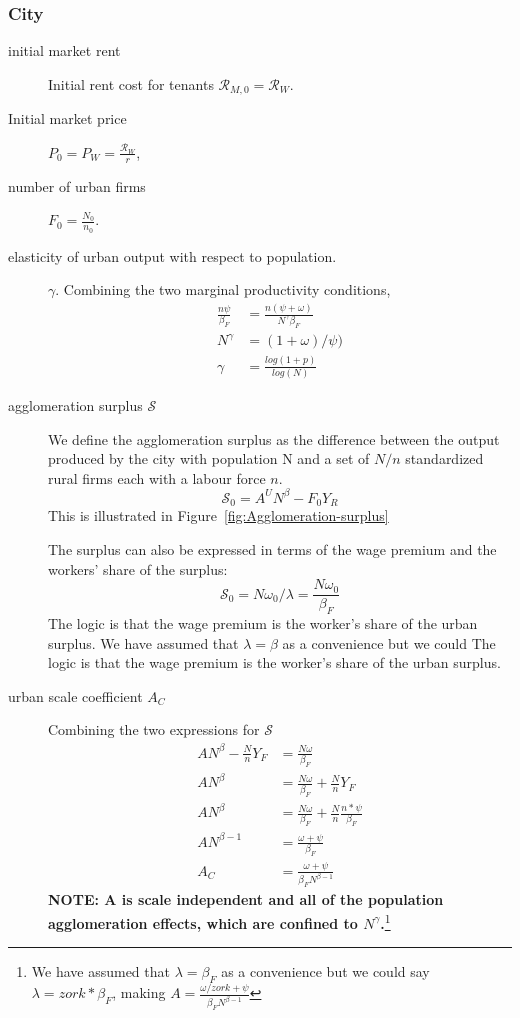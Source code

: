 \subsubsection{City}
\begin{description}
\item [initial market rent] 
Initial rent cost for tenants  $\mathcal{R}_{M, 0}= \mathcal{R}_W$.

\item [Initial market price] 
$P_0= P_W=\frac{\mathcal{R}_W }{r}$,  

\item[number of urban firms]  $F_0=\frac{N_0}{n_0}$. %

\item[elasticity of urban output with respect to population.] $\gamma$. Combining the two marginal productivity conditions, 
\begin{align}
\frac{n\psi}{\beta_F}  &= \frac{n(\psi+\omega)}{N^\gamma \beta_F}  \\
N^\gamma &= (1+\omega)/\psi)\\
\gamma &= \frac{log(1+p)}{log(N)}
\end{align}

\item [agglomeration surplus $\mathcal{S}$] We define the agglomeration surplus as the difference between the output produced by  the city with population N and a set of $N/n$ standardized rural firms each with a labour force $n$. 
\[\mathcal{S_0}=A^U N^\beta-F_0Y_R \] 
This is illustrated in Figure~\ref{fig:Agglomeration-surplus}

The surplus can also be expressed in terms of the wage premium and the workers' share of the surplus:
\[\mathcal{S_0}=N\omega_0/\lambda=\frac{N\omega_0}{\beta_F}\] 
The logic is that the wage premium is the worker's share of the urban surplus. We have assumed that $\lambda=\beta$ as a convenience but we could 
The logic is that the wage premium is the worker's share of the urban surplus. 

\item[urban scale coefficient $A_C$] Combining the two expressions for $\mathcal{S}$
\begin{align*}
 AN^\beta-\frac{N}{n}Y_F    &=\frac{N\omega}{\beta_F}\\ 
 AN^\beta   &=\frac{N\omega}{\beta_F} + \frac{N}{n}Y_F \\
 AN^\beta   &=\frac{N\omega}{\beta_F} + \frac{N}{n}\frac{n*\psi}{\beta_F}\\
AN^{\beta-1}   &=\frac{\omega+\psi}{\beta_F}\\ 
  A_C&=\frac{\omega+\psi}{\beta_FN^{\beta-1}}
\end{align*}
\textbf{NOTE: A is scale independent and all of the population agglomeration effects, which are confined to $N^\gamma$.}\footnote{We have assumed that $\lambda=\beta_F$ as a convenience but we could say $\lambda=zork*\beta_F$, making $A=\frac{\omega/zork +\psi}{\beta_FN^{\beta-1}}$ }
\end{description}


